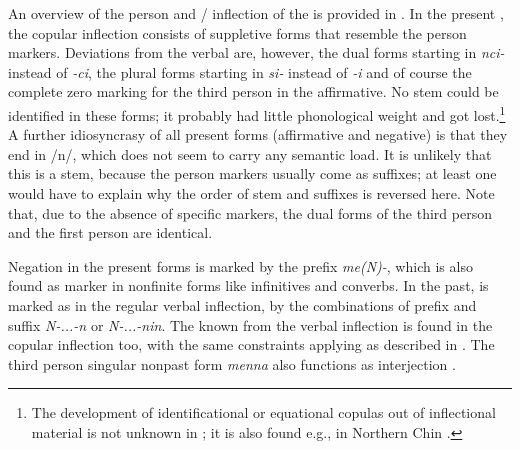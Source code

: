 An overview of the person and / inflection of the  is provided in . In the present , the copular inflection consists of suppletive forms that resemble the person markers. Deviations from  the verbal  are, however, the dual forms starting in \emph{nci-} instead of \emph{-ci}, the plural forms starting in  \emph{si-} instead of  \emph{-i} and of course the complete zero marking for the third person in the affirmative. No stem could be identified in these forms; it probably had little phonological weight and got lost.\footnote{The development of identificational or equational copulas out of inflectional material is not unknown in ; it is also found e.g., in Northern Chin \cite[9]{DeLancey2011_Notes}.}  A further idiosyncrasy of all present forms (affirmative and negative) is that they end in /n/, which does not seem to carry any semantic load. It is unlikely that this is a stem, because the person markers usually come as suffixes; at least one would have to explain why the order of stem and suffixes is reversed here.  Note that, due to the absence of specific markers, the dual forms of the third person and the first person  are identical.

\largerpage
Negation in the present forms is marked by the prefix \emph{me(N)-}, which is also found as  marker in nonfinite forms like infinitives and converbs. In the past,  is marked as in the regular verbal inflection, by the combinations of prefix and suffix \emph{N-...-n} or \emph{N-...-nin}. The  known from the verbal inflection is found in the copular inflection too, with the same constraints applying as described in . The third person singular nonpast form \emph{menna} also functions as interjection . 


